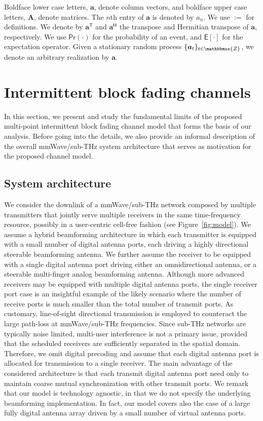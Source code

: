 \documentclass[10pt,journal,a4paper]{IEEEtran}
\newcommand{\eqdef}{:=}
\newcommand{\E}{\mathsf{E}}		%
\renewcommand{\P}{\mathsf{Pr}} 			%
\newcommand{\stdset}[1]{\mathbbmss{#1}}	%
\renewcommand{\vec}[1]{\bm{#1}}		%
\newcommand{\herm}{\mathsf{H}}			%
\newcommand{\T}{\mathsf{T}}				%
\begin{document}
Boldface lower case letters, $\vec{a}$, denote column vectors, and boldface upper case letters, $\vec{A}$, denote matrices. The $n$th entry of $\vec{a}$ is denoted by $a_n$. We use $\eqdef$ for definitions. We denote by $\vec{a}^\T$ and $\vec{a}^\herm$ the transpose and Hermitian transpose of $\vec{a}$, respectively. We use $\P(\cdot)$ for the probability of an event, and $\E[\cdot]$ for the expectation operator. Given a stationary random process $\{\vec{a}_t\}_{t\in \stdset{Z}}$, we denote an arbitrary realization by $\vec{a}$.

\section{Intermittent block fading channels}
\label{sec:model}
In this section, we present and study the fundamental limits of the proposed multi-point intermittent block fading channel model that forms the basis of our analysis. Before going into the details, we also provide an informal description of the overall mmWave/sub-THz system architecture that serves as motivation for the proposed channel model.
 
\subsection{System architecture}
We consider the downlink of a mmWave/sub-THz network composed by multiple transmitters that jointly serve multiple receivers in the same time-frequency resource, possibly in a user-centric cell-free fashion (see Figure~\ref{fig:model}). We assume a hybrid beamforming architecture in which each transmitter is equipped with a small number of digital antenna ports, each driving a highly directional steerable beamforming antenna. We further assume the receiver to be equipped with a single digital antenna port driving either an  omnidirectional antenna, or a steerable multi-finger analog beamforming antenna. Although more advanced receivers may be equipped with multiple digital antenna ports, the single receiver port case is an insightful example of the likely scenario where the number of receive ports is much smaller than the total number of transmit ports. As customary, line-of-sight directional transmission is employed to counteract the large path-loss at mmWave/sub-THz frequencies. Since sub-THz networks are typically noise limited, multi-user interference is not a primary issue, provided that the scheduled receivers are sufficiently separated in the spatial domain. Therefore, we omit digital precoding and assume that each digital antenna port is allocated for transmission to a single receiver. The main advantage of the considered architecture is that each transmit digital antenna port need only to maintain coarse mutual synchronization with other transmit ports. We remark that our model is technology agnostic, in that we do not specify the underlying beamforming implementation. In fact, our model covers also the case of a large fully digital antenna array driven by a small number of virtual antenna ports. 
\end{document}
